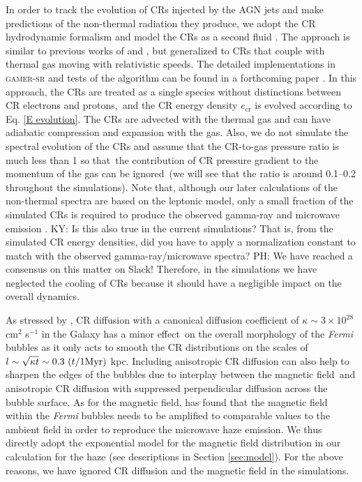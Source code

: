 \documentclass[fleqn,usenatbib,useAMS]{mnras}
\begin{document}
  In order to track the evolution of CRs injected by the AGN jets and make predictions of the non-thermal radiation they produce, we adopt the CR hydrodynamic formalism and model the CRs as a second fluid \citep{Zweibel2013}. The approach is similar to previous works of \cite{Guo2012} and \cite{Yang2012}, but generalized to CRs that couple with thermal gas moving with relativistic speeds. The detailed implementations in \textsc{gamer-sr} and tests of the algorithm can be found in a forthcoming paper \citep[][in prep.]{Chen2022}. In this approach, the CRs are treated as a single species without distinctions between CR electrons and protons,\
  and the CR energy density $e_{\text{cr}}$ is evolved according to Eq. \ref{E evolution}.
  The CRs are advected with the thermal gas and can have adiabatic compression and expansion with the gas. Also, we do not simulate the spectral evolution of the CRs and assume that the CR-to-gas pressure ratio is much less than 1 so that\
  the contribution of CR pressure gradient to the momentum of the gas can be ignored\
  (we will see that the ratio is around 0.1--0.2 throughout the simulations). Note that, although our later calculations of the non-thermal spectra are based on the leptonic model, only a small fraction of the simulated CRs is required to produce the observed gamma-ray and microwave emission \citep{Yang2013}.
{\color{red} KY: Is this also true in the current simulations? That is, from the simulated CR energy densities, did you have to apply a normalization constant to match with the observed gamma-ray/microwave spectra? PH: We have reached a consensus on this matter on Slack!}
Therefore, in the simulations we have neglected the cooling of CRs because it should have a negligible impact on the overall dynamics.

  As stressed by \citet{Yang2012}, CR diffusion with a canonical diffusion coefficient of $\kappa \sim 3\times 10^{28}$ cm$^2$ s$^{-1}$ in the Galaxy has a minor effect\
  on the overall morphology of the \textit{Fermi} bubbles as it
  only acts to smooth the CR distributions on the scales of $l \sim \sqrt{\kappa t} \sim 0.3\ (t/1 {\rm Myr})$ kpc. Including anisotropic CR diffusion can also help to sharpen the edges of the bubbles due to interplay between the magnetic field\
  and anisotropic CR diffusion with suppressed perpendicular diffusion across the bubble surface. As for the magnetic field, \cite{Yang2013} has found that the magnetic field within the \textit{Fermi} bubbles needs to be amplified to comparable values to the ambient field in order to reproduce the microwave haze emission. We thus directly adopt the exponential model for the magnetic field distribution in our calculation for the haze (see descriptions in Section \ref{sec:model}).
   For the above reasons, we have ignored CR diffusion and the magnetic field in the simulations.\
\end{document}
